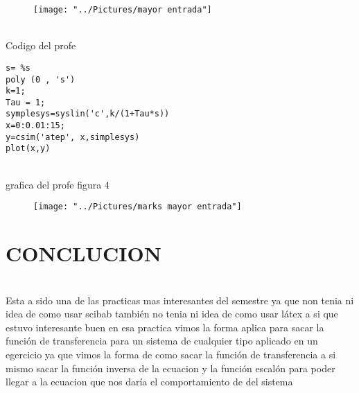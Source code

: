 \documentclass[12pt]{article}
\begin{document}
\begin{figure}[h]
\centering
\texttt{[image: "../Pictures/mayor entrada"]}
\caption{}
\label{fig:mayor-entrada}
\end{figure}
\\ Codigo del profe
\begin{lstlisting}
s= %s
poly (0 , 's')
k=1;
Tau = 1;
symplesys=syslin('c',k/(1+Tau*s))
x=0:0.01:15;
y=csim('atep', x,simplesys)
plot(x,y)
\end{lstlisting}

\\grafica del profe figura 4
\begin{figure}[h]
\centering
\texttt{[image: "../Pictures/marks mayor entrada"]}
\caption{}
\label{fig:marks-mayor-entrada}
\end{figure}
\section{CONCLUCION}

\\ Esta a sido una de las practicas mas interesantes del semestre ya que non tenia ni idea de como usar scibab también no tenia ni idea de como usar látex a si que estuvo interesante buen en esa practica vimos la forma aplica para sacar la función de transferencia para un sistema de cualquier tipo aplicado en un egercicio ya que vimos la forma de como sacar la función de transferencia a si mismo sacar la función inversa de la ecuacion y la función escalón para poder llegar a la ecuacion que nos daría el comportamiento de del sistema
\end{document}
